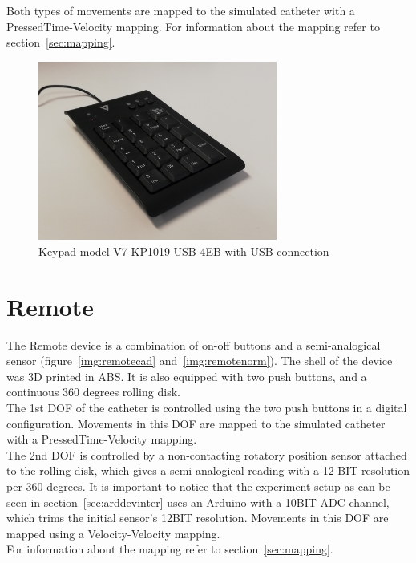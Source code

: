 Both types of movements are mapped to the simulated catheter with a PressedTime-Velocity mapping. For information about the mapping refer to section~\ref{sec:mapping}.\\

\begin{figure}[ht]
   \centering
   \includegraphics[width=0.7\textwidth]{img/keyboard.jpg}
   \caption{Keypad model V7-KP1019-USB-4EB with USB connection}
   \label{img:keyboardimg}
\end{figure}

\section{Remote}\label{sec:remote}
The Remote device is a combination of on-off buttons and a semi-analogical sensor (figure~\ref{img:remotecad} and~\ref{img:remotenorm}). The shell of the device was 3D printed in ABS. It is also equipped with two push buttons, and a continuous 360 degrees rolling disk.\\

The 1st DOF of the catheter is controlled using the two push buttons in a digital configuration. Movements in this DOF are mapped to the simulated catheter with a PressedTime-Velocity mapping.\\

The 2nd DOF is controlled by a non-contacting rotatory position sensor attached to the rolling disk, which gives a semi-analogical reading with a 12 BIT resolution per 360 degrees. It is important to notice that the experiment setup as can be seen in section~\ref{sec:arddevinter} uses an Arduino with a 10BIT ADC channel, which trims the initial sensor's 12BIT resolution. Movements in this DOF are mapped using a Velocity-Velocity mapping.\\

For information about the mapping refer to section~\ref{sec:mapping}.\\

